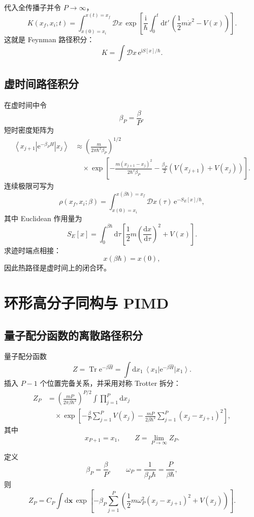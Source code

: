 \documentclass[11pt,a4paper,oneside,openany,fontset=fandol]{ctexbook}
\newcommand{\dd}{\mathrm{d}}
\newcommand{\ee}{\mathrm{e}}
\newcommand{\ii}{\mathrm{i}}
\newcommand{\Tr}{\operatorname{Tr}}
\newcommand{\ket}[1]{\left|#1\right\rangle}
\newcommand{\bra}[1]{\left\langle#1\right|}
\newcommand{\vct}[1]{\bm{#1}}
\begin{document}
代入全传播子并令 $P\to\infty$，
\[
K(x_f,x_i;t)
=
\int_{x(0)=x_i}^{x(t)=x_f}
\mathcal D x\,
\exp\left[
\frac{\ii}{\hbar}
\int_0^t\dd t'\,
\left(
\frac12m\dot x^2-V(x)
\right)
\right].
\]
这就是 Feynman 路径积分：
\[
\boxed{
K=\int\mathcal D x\,\ee^{\ii S[x]/\hbar}
}.
\]

\section{虚时间路径积分}

在虚时间中令
\[
\beta_P=\frac{\beta}{P},
\]
短时密度矩阵为
\begin{align}
\bra{x_{j+1}}
\ee^{-\beta_P\hat H}
\ket{x_j}
&\approx
\left(
\frac{m}{2\pi\hbar^2\beta_P}
\right)^{1/2}\\
&\quad\times
\exp\left[
-\frac{m(x_{j+1}-x_j)^2}{2\hbar^2\beta_P}
-\frac{\beta_P}{2}
\left(V(x_{j+1})+V(x_j)\right)
\right].
\end{align}
连续极限可写为
\[
\rho(x_f,x_i;\beta)
=
\int_{x(0)=x_i}^{x(\beta\hbar)=x_f}
\mathcal D x(\tau)\,
\ee^{-S_E[x]/\hbar},
\]
其中 Euclidean 作用量为
\[
S_E[x]
=
\int_0^{\beta\hbar}\dd\tau
\left[
\frac12m\left(\frac{\dd x}{\dd\tau}\right)^2+V(x)
\right].
\]
求迹时端点相接：
\[
x(\beta\hbar)=x(0),
\]
因此热路径是虚时间上的闭合环。

\chapter{环形高分子同构与 PIMD}

\section{量子配分函数的离散路径积分}

量子配分函数
\[
Z=\Tr\ee^{-\beta\hat H}
=
\int\dd x_1\,
\bra{x_1}\ee^{-\beta\hat H}\ket{x_1}.
\]
插入 $P-1$ 个位置完备关系，并采用对称 Trotter 拆分：
\begin{align}
Z_P
&=
\left(
\frac{mP}{2\pi\beta\hbar^2}
\right)^{P/2}
\int\prod_{j=1}^{P}\dd x_j\\
&\quad\times
\exp\left[
-\frac{\beta}{P}\sum_{j=1}^{P}V(x_j)
-\frac{mP}{2\beta\hbar^2}
\sum_{j=1}^{P}(x_j-x_{j+1})^2
\right],
\end{align}
其中
\[
x_{P+1}=x_1,
\qquad
Z=\lim_{P\to\infty}Z_P.
\]

定义
\[
\beta_P=\frac{\beta}{P},
\qquad
\omega_P=\frac{1}{\beta_P\hbar}
=\frac{P}{\beta\hbar},
\]
则
\[
Z_P
=
C_P
\int\dd\vct x\,
\exp\left[
-\beta_P
\sum_{j=1}^{P}
\left(
\frac12m\omega_P^2(x_j-x_{j+1})^2+V(x_j)
\right)
\right].
\]
\end{document}
